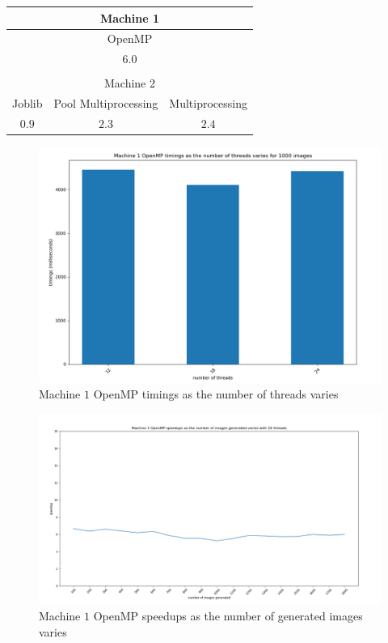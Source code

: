 \documentclass{article}
\begin{document}
\begin{center}
 \label{Speedups}
\begin{tabular}{|c|c|c|c|}
\hline
\multicolumn{4}{|c|}{Machine 1}\\
\hline
\multicolumn{4}{|c|}{OpenMP}\\
\hline
\multicolumn{4}{|c|}{$ 6.0 $}\\
\hline
\multicolumn{4}{|c|}{}\\
\hline
\multicolumn{4}{|c|}{Machine 2}\\
\hline
\multicolumn{1}{|c|}{\hspace*{0.5cm}Joblib\hspace*{0.5cm}} & \multicolumn{2}{c|}{Pool Multiprocessing} & \multicolumn{1}{c|}{Multiprocessing}\\
\hline
\multicolumn{1}{|c|}{$ 0.9 $} & \multicolumn{2}{c|}{$ 2.3 $} & \multicolumn{1}{c|}{$ 2.4 $}\\
\hline
\end{tabular}

\newpage

\begin{figure}[!h]
\centering
\includegraphics[width= 12cm]{"Immagini/Timings_Varying_Threads.PNG"}
\caption{Machine $ 1 $ OpenMP timings as the number of threads varies}
\label{Timings_Varying_Threads}
\end{figure}

\begin{figure}[!h]
\centering
\includegraphics[width= 13cm]{"Immagini/Speedup_Varying_Transformations.PNG"}
\caption{Machine $ 1 $ OpenMP speedups as the number of generated images varies}
\label{Speedups_Varying_Transformations}
\end{figure}

\end{center}
\end{document}
